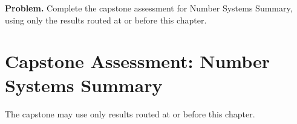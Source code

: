 \newpage
{}
\label{cap:numbers-summary}

\begin{tcolorbox}[
  colback=gray!6,
  colframe=gray!40,
  arc=2pt,
  left=8pt, right=8pt, top=6pt, bottom=6pt,
  title={\small\textbf{Capstone Problem}},
  fonttitle=\small\bfseries
]
\textbf{Problem.}
Complete the capstone assessment for Number Systems Summary, using only the results routed at or before this chapter.
\end{tcolorbox}

\section{Capstone Assessment: Number Systems Summary}

\begin{remark*}
The capstone may use only results routed at or before this chapter.
\end{remark*}

\clearpage
